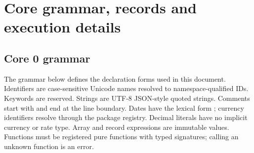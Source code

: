 \chapter{Core grammar, records and execution details}
\label{app:contracts}

\section{Core 0 grammar}

The grammar below defines the declaration forms used in this document.
Identifiers are case-sensitive Unicode names resolved to namespace-qualified
IDs. Keywords are reserved. Strings are UTF-8 JSON-style quoted strings.
Comments start with \code{//} and end at the line boundary. Dates have the
lexical form ; currency identifiers resolve through the
package registry. Decimal literals have no implicit currency or rate type.
Array and record expressions are immutable values. Functions must be registered
pure functions with typed signatures; calling an unknown function is an error.

